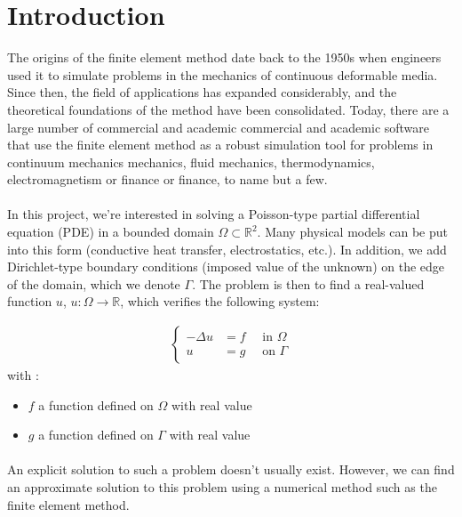 \documentclass[11pt,a4paper]{article}
\begin{document}
\section{Introduction}

The origins of the finite element method date back to the 1950s
when engineers used it to simulate problems in the mechanics
of continuous deformable media. Since then, the field of applications has expanded
considerably, and the theoretical foundations of the method have been
consolidated. Today, there are a large number of commercial and academic
commercial and academic software that use the finite element method
as a robust simulation tool for problems in continuum mechanics
mechanics, fluid mechanics, thermodynamics, electromagnetism or finance
or finance, to name but a few. %


\paragraph{}
In this project, we're interested in solving a Poisson-type partial differential equation (PDE) in a bounded domain $\Omega \subset \mathbb{R}^2$.
Many physical models can be put into this form (conductive heat transfer, electrostatics, etc.).
In addition, we add Dirichlet-type boundary conditions (imposed value of the unknown) on the edge of the domain, which we denote $\Gamma$.
The problem is then to find a real-valued function $u$, $u : \Omega \longrightarrow \mathbb{R}$, which verifies the following system:

\begin{eqnarray}
\left\{
  \begin{aligned}
    - \Delta u &= f \quad \text{ in } \Omega \\
    u &= g \quad \text{ on } \Gamma
  \end{aligned}
  \right.
\end{eqnarray}
with :
\begin{itemize}
  \item $f$ a function defined on $\Omega$ with real value
  \item $g$ a function defined on $\Gamma$ with real value
\end{itemize}

\paragraph{}
An explicit solution to such a problem doesn't usually exist. However, we can find an approximate solution to this problem using
a numerical method such as the finite element method.
\end{document}
